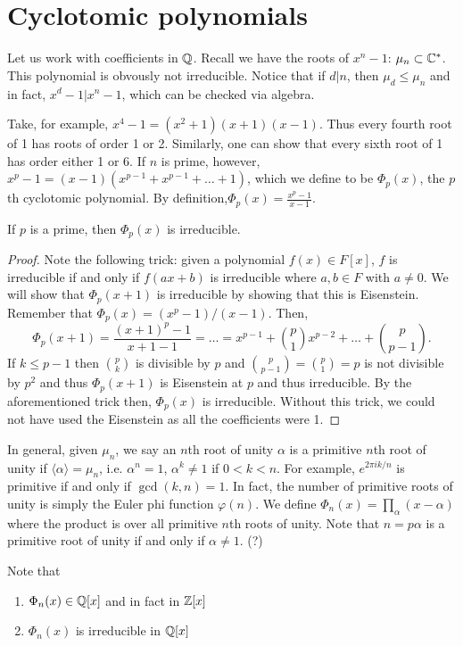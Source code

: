 \documentclass{../mathnotes}
\begin{document}
\section{Cyclotomic polynomials}

Let us work with coefficients in $\mathbb{Q}$. Recall we have the roots of $x^n-1$: $\mu_n\subset\mathbb{C}^*$. This polynomial is obvously
not irreducible. Notice that if $d|n$, then $\mu_d\leq\mu_n$ and in fact, $x^d-1|x^n-1$, which can be checked via algebra.

Take, for example, $x^4-1=(x^2+1)(x+1)(x-1)$. Thus every fourth root of 1 has roots of order 1 or 2. Similarly,
one can show that every sixth root of 1 has order either 1 or 6. If $n$ is prime, however, $x^p-1=(x-1)(x^{p-1}+x^{p-1}+\ldots+1)$,
which we define to be $\Phi_p(x)$, the $p$th cyclotomic polynomial. By definition,$\Phi_p(x)=\frac{x^p-1}{x-1}$.

\begin{thm}
    If $p$ is a prime, then $\Phi_p(x)$ is irreducible.
\end{thm}

\begin{proof}
    Note the following trick: given a polynomial $f(x)\in F[x]$, $f$ is irreducible if and only if $f(ax+b)$ is irreducible where $a,b\in F$ with $a\neq 0$.
    We will show that $\Phi_p(x+1)$ is irreducible by showing that this is Eisenstein. Remember that $\Phi_p(x)=(x^p-1)/(x-1)$. Then,
    \[\Phi_p(x+1)=\frac{(x+1)^p-1}{x+1-1}=\ldots=x^{p-1}+\binom{p}{1}x^{p-2}+\ldots+\binom{p}{p-1}.\]
    If $k\leq p-1$ then $\binom{p}{k}$ is divisible by $p$ and $\binom{p}{p-1}=\binom{p}{1}=p$ is not divisible by $p^2$
    and thus $\Phi_p(x+1)$ is Eisenstein at $p$ and thus irreducible. By the aforementioned trick then, $\Phi_p(x)$ is irreducible.
    Without this trick, we could not have used the Eisenstein as all the coefficients were 1.
\end{proof}

In general, given $\mu_n$, we say an $n$th root of unity $\alpha$ is a primitive $n$th root of unity if $\langle \alpha\rangle=\mu_n$,
i.e. $\alpha^n=1$, $\alpha^k\neq 1$ if $0<k<n$. For example, $e^{2\pi ik/n}$ is primitive if and only if $\gcd(k,n)=1$. In fact, the number
of primitive roots of unity is simply the Euler phi function $\varphi(n)$. We define $\Phi_n(x)=\prod_\alpha(x-\alpha)$ where the product is over
all primitive $n$th roots of unity. Note that $n=p\alpha$ is a primitive root of unity if and only if $\alpha\neq 1$. (?)

Note that
\begin{enumerate}
    \item $\Phi_n(x)\in\mathbb{Q}[x]$ and in fact in $\mathbb{Z}[x]$
    \item $\Phi_n(x)$ is irreducible in $\mathbb{Q}[x]$
\end{enumerate}
\end{document}
